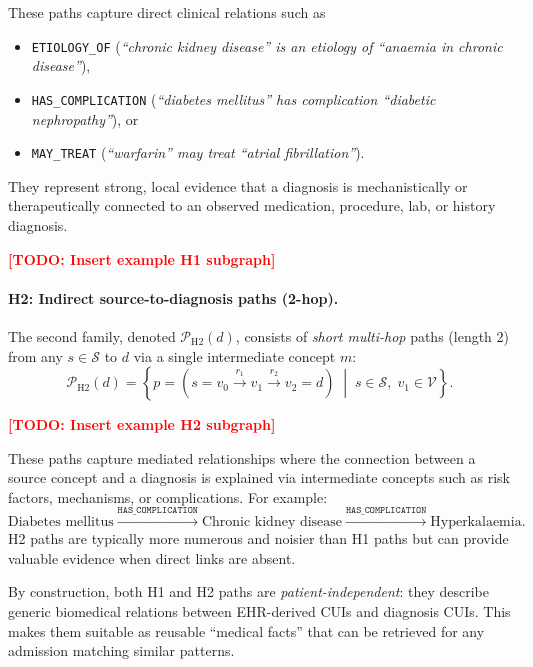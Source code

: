 These paths capture direct clinical relations such as
\begin{itemize}
    \item \texttt{ETIOLOGY\_OF} (\emph{``chronic kidney disease'' is an etiology of ``anaemia in chronic disease''}),
    \item \texttt{HAS\_COMPLICATION} (\emph{``diabetes mellitus'' has complication ``diabetic nephropathy''}), or
    \item \texttt{MAY\_TREAT} (\emph{``warfarin'' may treat ``atrial fibrillation''}).
\end{itemize}
They represent strong, local evidence that a diagnosis is mechanistically or therapeutically connected to an observed medication, procedure, lab, or history diagnosis.

\textcolor{red}{\textbf{[TODO: Insert example H1 subgraph]}}

\paragraph{H2: Indirect source-to-diagnosis paths (2-hop).}

The second family, denoted $\mathcal{P}_{\text{H2}}(d)$, consists of \emph{short multi-hop} paths (length $2$) from any $s \in \mathcal{S}$ to $d$ via a single intermediate concept $m$:
\begin{equation}
    \mathcal{P}_{\text{H2}}(d)
    =
    \left\{
        p = (s = v_0 \xrightarrow{r_1} v_1 \xrightarrow{r_2} v_2 = d)
        \;\middle|\;
        s \in \mathcal{S},\; v_1 \in \mathcal{V}
    \right\}.
\end{equation}

\textcolor{red}{\textbf{[TODO: Insert example H2 subgraph]}}

These paths capture mediated relationships where the connection between a source concept and a diagnosis is explained via intermediate concepts such as risk factors, mechanisms, or complications. For example:
\[
    \text{Diabetes mellitus}
    \xrightarrow{\texttt{HAS\_COMPLICATION}}
    \text{Chronic kidney disease}
    \xrightarrow{\texttt{HAS\_COMPLICATION}}
    \text{Hyperkalaemia}.
\]
H2 paths are typically more numerous and noisier than H1 paths but can provide valuable evidence when direct links are absent.

By construction, both H1 and H2 paths are \emph{patient-independent}: they describe generic biomedical relations between EHR-derived CUIs and diagnosis CUIs. This makes them suitable as reusable ``medical facts'' that can be retrieved for any admission matching similar patterns.

